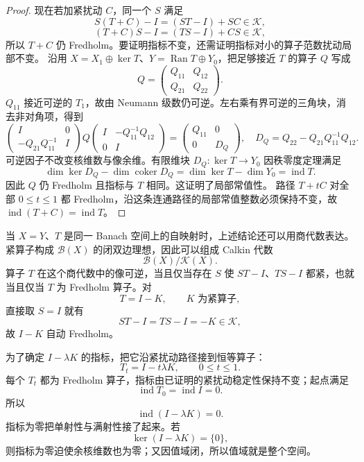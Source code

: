 \begin{proof}
现在若加紧扰动 $C$，同一个 $S$ 满足
\[
S(T+C)-I=(ST-I)+SC\in\mathcal K,
\]
\[
(T+C)S-I=(TS-I)+CS\in\mathcal K,
\]
所以 $T+C$ 仍 Fredholm。要证明指标不变，还需证明指标对小的算子范数扰动局部不变。
沿用 $X=X_1\oplus\ker T$、$Y=\operatorname{Ran}T\oplus Y_0$，把足够接近 $T$ 的算子 $Q$ 写成
\[
Q=\begin{pmatrix}Q_{11}&Q_{12}\\Q_{21}&Q_{22}\end{pmatrix}.
\]
$Q_{11}$ 接近可逆的 $T_1$，故由 Neumann 级数仍可逆。左右乘有界可逆的三角块，消去非对角项，得到
\[
\begin{pmatrix}I&0\\-Q_{21}Q_{11}^{-1}&I\end{pmatrix}
Q
\begin{pmatrix}I&-Q_{11}^{-1}Q_{12}\\0&I\end{pmatrix}
=\begin{pmatrix}Q_{11}&0\\0&D_Q\end{pmatrix},
\quad D_Q=Q_{22}-Q_{21}Q_{11}^{-1}Q_{12}.
\]
可逆因子不改变核维数与像余维。有限维块 $D_Q:\ker T\to Y_0$ 因秩零度定理满足
\[
\dim\ker D_Q-\dim\operatorname{coker}D_Q
=\dim\ker T-\dim Y_0=\operatorname{ind}T.
\]
因此 $Q$ 仍 Fredholm 且指标与 $T$ 相同。这证明了局部常值性。
路径 $T+tC$ 对全部 $0\le t\le1$ 都 Fredholm，沿这条连通路径的局部常值整数必须保持不变，故 $\operatorname{ind}(T+C)=\operatorname{ind}T$。
\end{proof}


当 $X=Y$、$T$ 是同一 Banach 空间上的自映射时，上述结论还可以用商代数表达。紧算子构成 $\mathcal B(X)$ 的闭双边理想，因此可以组成 Calkin 代数
\[
\mathcal B(X)/\mathcal K(X).
\]
算子 $T$ 在这个商代数中的像可逆，当且仅当存在 $S$ 使 $ST-I$、$TS-I$ 都紧，也就当且仅当 $T$ 为 Fredholm 算子。对
\[
T=I-K,
\qquad K\text{ 为紧算子},
\]
直接取 $S=I$ 就有
\[
ST-I=TS-I=-K\in\mathcal K,
\]
故 $I-K$ 自动 Fredholm。

为了确定 $I-\lambda K$ 的指标，把它沿紧扰动路径接到恒等算子：
\[
T_t=I-t\lambda K,
\qquad0\le t\le1.
\]
每个 $T_t$ 都为 Fredholm 算子，指标由已证明的紧扰动稳定性保持不变；起点满足
\[
\operatorname{ind}T_0=\operatorname{ind}I=0.
\]
所以
\begin{equation*}\boxed{
\operatorname{ind}(I-\lambda K)=0.
}\end{equation*}
指标为零把单射性与满射性接了起来。若
\[
\ker(I-\lambda K)=\{0\},
\]
则指标为零迫使余核维数也为零；又因值域闭，所以值域就是整个空间。

